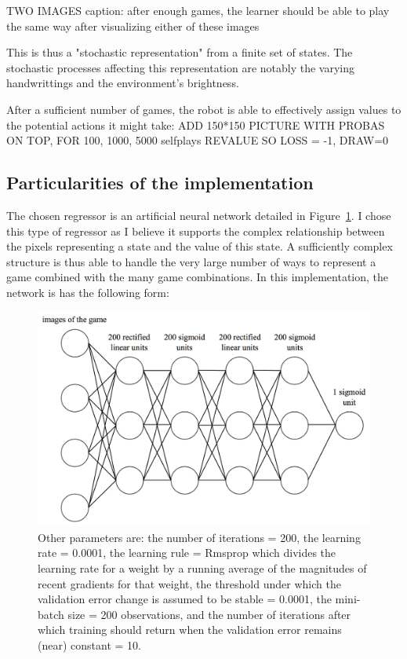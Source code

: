 \documentclass[letterpaper, 10.5 pt, conference]{ieeeconf}
\begin{document}
TWO IMAGES
caption: after enough games, the learner should be able to play the same way after visualizing either of these images

This is thus a "stochastic representation" from a finite set of states. The stochastic processes affecting this representation are notably the varying handwrittings and the environment's brightness.

After a sufficient number of games, the robot is able to effectively assign values to the potential actions it might take:
ADD 150*150 PICTURE WITH PROBAS ON TOP, FOR 100, 1000, 5000 selfplays
REVALUE SO LOSS = -1, DRAW=0

\subsection{Particularities of the implementation}

The chosen regressor is an artificial neural network detailed in Figure~\ref{fig:neuralnet}. I chose this type of regressor as I believe it supports the complex relationship between the pixels representing a state and the value of this state. A sufficiently complex structure is thus able to handle the very large number of ways to represent a game combined with the many game combinations. In this implementation, the network is has the following form:

\begin{figure}
\begin{center}
\includegraphics[scale=.25]{"NNview"}
\caption{Other parameters are: the number of iterations = 200, the learning rate = 0.0001, the learning rule = Rmsprop which divides the learning rate for a weight by a running average of the magnitudes of recent gradients for that weight, the threshold under which the validation error change is assumed to be stable = 0.0001, the mini-batch size = 200 observations, and the number of iterations after which training should return when the validation error remains (near) constant = 10.}
\label{fig:neuralnet}
\end{center}
\end{figure}
\end{document}
